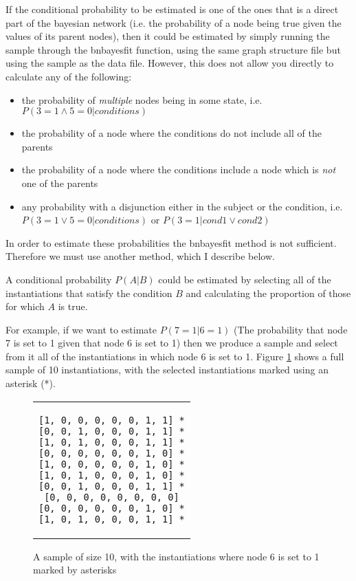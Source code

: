 \documentclass[a4paper,11pt]{article}
\begin{document}
If the conditional probability to be estimated is one of the ones that is a direct part of the bayesian network (i.e. the probability of a node being true given the values of its parent nodes), then it could be estimated by simply running the sample through the bnbayesfit function, using the same graph structure file but using the sample as the data file.  However, this does not allow you directly to calculate any of the following:
\begin{itemize}
	\item the probability of \textit{multiple} nodes being in some state, i.e. $P(3=1\wedge{}5=0|conditions)$
	\item the probability of a node where the conditions do not include all of the parents
	\item the probability of a node where the conditions include a node which is \textit{not} one of the parents
	\item any probability with a disjunction either in the subject or the condition, i.e. ${P(3=1\vee{}5=0|conditions)}$ or ${P(3=1|cond1\vee{}cond2)}$
\end{itemize}
In order to estimate these probabilities the bnbayesfit method is not sufficient.  Therefore we must use another method, which I describe below.

A conditional probability $P(A|B)$ could be estimated by selecting all of the instantiations that satisfy the condition $B$ and calculating the proportion of those for which $A$ is true.

For example, if we want to estimate $P(7=1|6=1)$ (The probability that node 7 is set to 1 given that node 6 is set to 1) then we produce a sample and select from it all of the instantiations in which node 6 is set to 1.  Figure \ref{sample1} shows a full sample of 10 instantiations, with the selected instantiations marked using an asterisk (*).

\begin{figure}[h]
	\centering
	\lstset{basicstyle=\ttfamily}
	\begin{tabular}{c}
	\begin{lstlisting}
[1, 0, 0, 0, 0, 0, 1, 1] *
[0, 0, 1, 0, 0, 0, 1, 1] *
[1, 0, 1, 0, 0, 0, 1, 1] *
[0, 0, 0, 0, 0, 0, 1, 0] *
[1, 0, 0, 0, 0, 0, 1, 0] *
[1, 0, 1, 0, 0, 0, 1, 0] *
[0, 0, 1, 0, 0, 0, 1, 1] *
[0, 0, 0, 0, 0, 0, 0, 0]
[0, 0, 0, 0, 0, 0, 1, 0] *
[1, 0, 1, 0, 0, 0, 1, 1] *
	\end{lstlisting}
	\end{tabular}
	\caption{A sample of size 10, with the instantiations where node 6 is set to 1 marked by asterisks}
	\label{sample1}
\end{figure}
\end{document}
